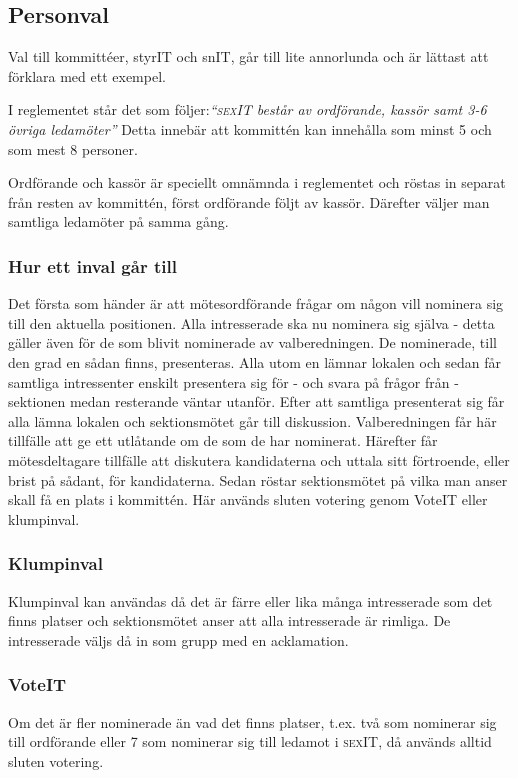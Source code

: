 \documentclass[11pt, noincludeaddress]{classes/cthit}
\begin{document}
\subsection{Personval}
Val till kommittéer, styrIT och snIT, går till lite annorlunda och är lättast att förklara med ett exempel.

I reglementet står det som följer:\textit{“\textsc{sex}IT består av ordförande, kassör samt 3-6 övriga ledamöter”} Detta innebär att kommittén kan innehålla som minst 5 och som mest 8 personer.

Ordförande och kassör är speciellt omnämnda i reglementet och röstas in separat från resten av kommittén, först ordförande följt av kassör. Därefter väljer man samtliga ledamöter på samma gång.

\subsubsection{Hur ett inval går till}
Det första som händer är att mötesordförande frågar om någon vill nominera sig till den aktuella positionen. Alla intresserade ska nu nominera sig själva - detta gäller även för de som blivit nominerade av valberedningen. De nominerade, till den grad en sådan finns, presenteras. Alla utom en lämnar lokalen och sedan får samtliga intressenter enskilt presentera sig för - och svara på frågor från - sektionen medan resterande väntar utanför. Efter att samtliga presenterat sig får alla lämna lokalen och sektionsmötet går till diskussion. Valberedningen får här tillfälle att ge ett utlåtande om de som de har nominerat. Härefter får mötesdeltagare tillfälle att diskutera kandidaterna och uttala sitt förtroende, eller brist på sådant, för kandidaterna. Sedan röstar sektionsmötet på vilka man anser skall få en plats i kommittén. Här används sluten votering genom VoteIT eller klumpinval. 

\subsubsection{Klumpinval}
Klumpinval kan användas då det är färre eller lika många intresserade som det finns platser och sektionsmötet anser att alla intresserade är rimliga. De intresserade väljs då in som grupp med en acklamation.

\subsubsection{VoteIT}
Om det är fler nominerade än vad det finns platser, t.ex. två som nominerar sig till ordförande eller 7 som nominerar sig till ledamot i \textsc{sex}IT, då används alltid sluten votering. 
\end{document}
